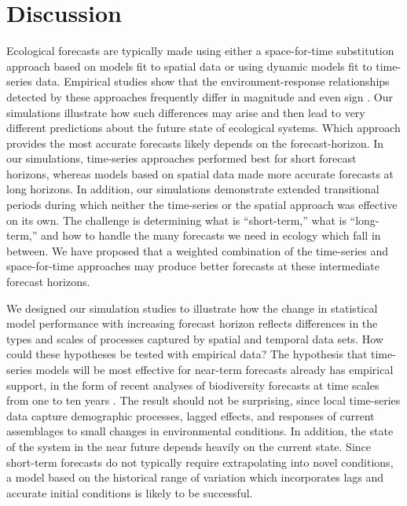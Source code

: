 \documentclass[11pt]{article}
\begin{document}
\section*{Discussion}

Ecological forecasts are typically made using either a space-for-time substitution approach based on models fit to spatial data or using dynamic models fit to time-series data. Empirical studies show that the environment-response relationships detected by these approaches frequently differ in magnitude and even sign \citep{lauenroth_long-term_1992,Oedekoven2017,Amburgey2018,kleinhesselink_response_2018}. Our simulations illustrate how such differences may arise and then lead to very different predictions about the future state of ecological systems. Which approach provides the most accurate forecasts likely depends on the forecast-horizon. In our simulations, time-series approaches performed best for short forecast horizons, whereas models based on spatial data made more accurate forecasts at long horizons. In addition, our simulations demonstrate extended transitional periods during which neither the time-series or the spatial approach was effective on its own. The challenge is determining what is ``short-term,'' what is ``long-term,'' and how to handle the many forecasts we need in ecology which fall in between. We have proposed that a weighted combination of the time-series and space-for-time approaches may produce better forecasts at these intermediate forecast horizons.

We designed our simulation studies to illustrate how the change in statistical model performance with increasing forecast horizon reflects differences in the types and scales of processes captured by spatial and temporal data sets. How could these hypotheses be tested with empirical data? The hypothesis that time-series models will be most effective for near-term forecasts already has empirical support, in the form of recent analyses of biodiversity forecasts at time scales from one to ten years \citep{harris_forecasting_2018}. The result should not be surprising, since local time-series data capture demographic processes, lagged effects, and responses of current assemblages to small changes in environmental conditions. In addition, the state of the system in the near future depends heavily on the current state. Since short-term forecasts do not typically require extrapolating into novel conditions, a model based on the historical range of variation which incorporates lags and accurate initial conditions is likely to be successful.
\end{document}
